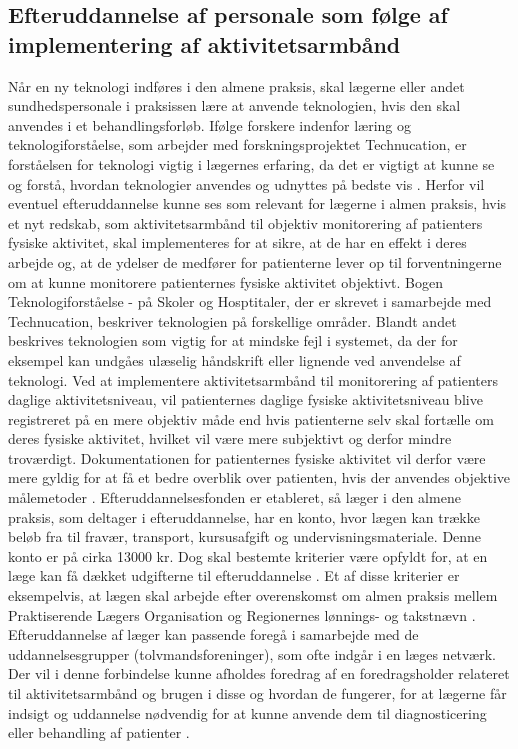  
\subsection{Efteruddannelse af personale som følge af implementering af aktivitetsarmbånd}
Når en ny teknologi indføres i den almene praksis, skal lægerne eller andet sundhedspersonale i praksissen lære at anvende teknologien, hvis den skal anvendes i et behandlingsforløb. 
Ifølge forskere indenfor læring og teknologiforståelse, som arbejder med forskningsprojektet Technucation, er forståelsen for teknologi vigtig i lægernes erfaring, da det er vigtigt at kunne se og forstå, hvordan teknologier anvendes og udnyttes på bedste vis \citep{aarhusuniversitet2013}. Herfor vil eventuel efteruddannelse kunne ses som relevant for lægerne i almen praksis, hvis et nyt redskab, som aktivitetsarmbånd til objektiv monitorering af patienters fysiske aktivitet, skal implementeres for at sikre, at de har en effekt i deres arbejde og, at de ydelser de medfører for patienterne lever op til forventningerne om at kunne monitorere patienternes fysiske aktivitet objektivt. Bogen Teknologiforståelse - på Skoler og Hosptitaler, der er skrevet i samarbejde med Technucation, beskriver teknologien på forskellige områder. Blandt andet beskrives teknologien som vigtig for at mindske fejl i systemet, da der for eksempel kan undgåes ulæselig håndskrift eller lignende ved anvendelse af teknologi. Ved at implementere aktivitetsarmbånd til monitorering af patienters daglige aktivitetsniveau, vil patienternes daglige fysiske aktivitetsniveau blive registreret på en mere objektiv måde end hvis patienterne selv skal fortælle om deres fysiske aktivitet, hvilket vil være mere subjektivt og derfor mindre troværdigt. Dokumentationen for patienternes fysiske aktivitet vil derfor være mere gyldig for at få et bedre overblik over patienten, hvis der anvendes objektive målemetoder \citep{hasse2012}. 
Efteruddannelsesfonden er etableret, så læger i den almene praksis, som deltager i efteruddannelse, har en konto, hvor lægen kan trække beløb fra til fravær, transport, kursusafgift og undervisningsmateriale. Denne konto er på cirka 13000 kr. Dog skal bestemte kriterier være opfyldt for, at en læge kan få dækket udgifterne til efteruddannelse \citep{vedsted2005}. Et af disse kriterier er eksempelvis, at lægen skal arbejde efter overenskomst om almen praksis mellem Praktiserende Lægers Organisation og Regionernes lønnings- og takstnævn \citep{fondenforalmenpraksis2016}. Efteruddannelse af læger kan passende foregå i samarbejde med de uddannelsesgrupper (tolvmandsforeninger), som ofte indgår i en læges netværk. Der vil i denne forbindelse kunne afholdes foredrag af en foredragsholder relateret til aktivitetsarmbånd og brugen i disse og hvordan de fungerer, for at lægerne får indsigt og uddannelse nødvendig for at kunne anvende dem til diagnosticering eller behandling af patienter \citep{vedsted2005}. 
\\
